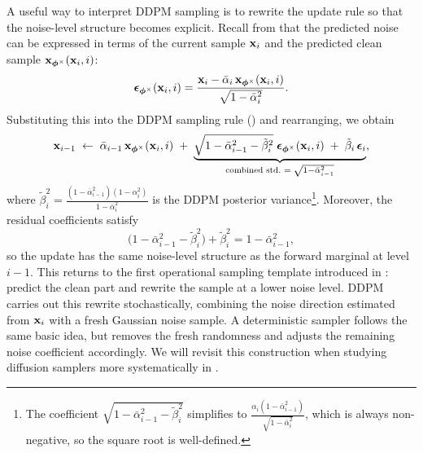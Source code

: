 A useful way to interpret DDPM sampling is to rewrite the update rule
so that the noise-level structure becomes explicit.
Recall from  that the predicted noise can be
expressed in terms of the current sample ${\mathbf{x}}_i$ and the predicted
clean sample ${\mathbf{x}}_{\bm{\phi}^\times}({\mathbf{x}}_i,i)$:
\[
\boldsymbol{\epsilon}_{\bm{\phi}^\times}({\mathbf{x}}_i,i)
=
\frac{{\mathbf{x}}_i - \bar{\alpha}_i\,{\mathbf{x}}_{\bm{\phi}^\times}({\mathbf{x}}_i,i)}
     {\sqrt{1-\bar{\alpha}_i^2}}.
\]
Substituting this into the DDPM sampling rule
() and rearranging, we obtain
\begin{equation}\label{eq:ddpm-renoise}
{\mathbf{x}}_{i-1}
\;\leftarrow\;
\bar{\alpha}_{i-1}\,{\mathbf{x}}_{\bm{\phi}^\times}({\mathbf{x}}_i,i)
\;+\;
\underbrace{
  \sqrt{1-\bar{\alpha}_{i-1}^2 - \tilde{\beta}_i^2}\;
  \boldsymbol{\epsilon}_{\bm{\phi}^\times}({\mathbf{x}}_i,i)
  \;+\;
  \tilde{\beta}_i\,\boldsymbol{\epsilon}_i
}_{\text{combined std.\ }=\;\sqrt{1-\bar{\alpha}_{i-1}^2}},
\end{equation}
where $\tilde{\beta}_i^2
= \frac{(1-\bar{\alpha}_{i-1}^2)(1-\alpha_i^2)}{1-\bar{\alpha}_i^2}$
is the DDPM posterior variance\footnote{%
The coefficient
$\sqrt{1-\bar{\alpha}_{i-1}^2 - \tilde{\beta}_i^2}$
simplifies to
$\frac{\alpha_i(1-\bar{\alpha}_{i-1}^2)}{\sqrt{1-\bar{\alpha}_i^2}}$,
which is always non-negative, so the square root is well-defined.}.
Moreover, the residual coefficients satisfy
\[
\bigl(1-\bar{\alpha}_{i-1}^2-\tilde{\beta}_i^2\bigr)+\tilde{\beta}_i^2
=
1-\bar{\alpha}_{i-1}^2,
\]
so the update has the same noise-level structure as the forward marginal
at level $i-1$. This returns to the first operational sampling template introduced in
: predict the clean part and rewrite the sample
at a lower noise level. DDPM carries out this rewrite stochastically,
combining the noise direction estimated from ${\mathbf{x}}_i$ with a fresh
Gaussian noise sample. A deterministic sampler follows the same basic
idea, but removes the fresh randomness and adjusts the remaining noise
coefficient accordingly. We will revisit this construction when studying
diffusion samplers more systematically in .

